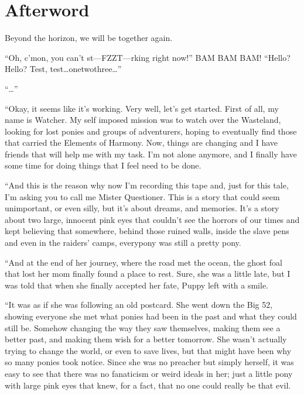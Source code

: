 \chapter{Afterword}


\begin{intro}
Beyond the horizon, we will be together again.
\end{intro}

{\rt

``Oh, c'mon, you can't st---FZZT---rking right now!'' BAM BAM BAM! ``Hello? Hello? Test, test\dots onetwothree\dots''

``\dots''

``Okay, it seems like it's working. Very well, let's get started. First of all, my name is Watcher. My self imposed mission was to watch over the Wasteland, looking for lost ponies and groups of adventurers, hoping to eventually find those that carried the Elements of Harmony. Now, things are changing and I have friends that will help me with my task. I'm not alone anymore, and I finally have some time for doing things that I feel need to be done.

``And this is the reason why now I'm recording this tape and, just for this tale, I'm asking you to call me Mister Questioner. This is a story that could seem unimportant, or even silly, but it's about dreams, and memories. It's a story about two large, innocent pink eyes that couldn't see the horrors of our times and kept believing that somewhere, behind those ruined walls, inside the slave pens and even in the raiders' camps, everypony was still a pretty pony.

``And at the end of her journey, where the road met the ocean, the ghost foal that lost her mom finally found a place to rest. Sure, she was a little late, but I was told that when she finally accepted her fate, Puppy left with a smile.

``It was as if she was following an old postcard. She went down the Big 52, showing everyone she met what ponies had been in the past and what they could still be. Somehow changing the way they saw themselves, making them see a better past, and making them wish for a better tomorrow. She wasn't actually trying to change the world, or even to save lives, but that might have been why so many ponies took notice. Since she was no preacher but simply herself, it was easy to see that there was no fanaticism or weird ideals in her; just a little pony with large pink eyes that knew, for a fact, that no one could really be that evil.

}

